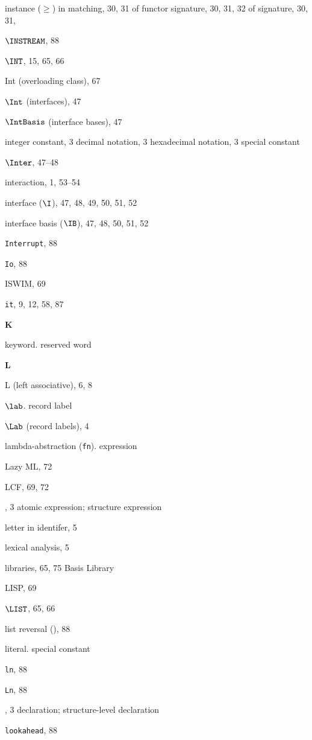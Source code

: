\begin{theindex}
\item instance ($\geq$)
\subitem in matching, 30, 31
\subitem of functor signature, 30, 31, 32
\subitem of signature, 30, 31,
\item $\INSTREAM$, 88
\item $\INT$, 15, 65, 66
\item Int (overloading class), 67
\item $\Int$ (interfaces), 47
\item $\IntBasis$ (interface bases), 47
\item integer constant, 3
\subitem decimal notation, 3
\subitem hexadecimal notation, 3
\subitem \seealso special constant
\item $\Inter$, 47--48
\item interaction, 1, 53--54
\item interface ($\I$), 47, 48, 49, 50, 51, 52
\item interface basis ($\IB$), 47, 48, 50, 51, 52
\item {\tt Interrupt}, 88
\item {\tt Io}, 88
\item ISWIM, 69
\item {\tt it}, 9, 12, 58, 87
\indexspace

\parbox{64mm}{\hfil{\large\bf K}\hfil}

\indexspace
\item keyword. \see reserved word
\indexspace

\parbox{64mm}{\hfil{\large\bf L}\hfil}

\indexspace

\item L (left associative), 6, 8
\item $\lab$. \see record label
\item $\Lab$ (record labels), 4
\item lambda-abstraction ({\tt fn}). \see expression
\item Lazy ML, 72
\item LCF, 69, 72
\item \LET, 3
\subitem \seealso atomic expression; structure expression
\item letter in identifer, 5
\item lexical analysis, 5
\item libraries, 65, 75
\subitem \seealso Basis Library
\item LISP, 69
\item $\LIST$, 65, 66
\item list reversal (), 88
\item literal. \see special constant
\item {\tt ln}, 88
\item {\tt Ln}, 88
\item \LOCAL, 3
\subitem \seealso declaration; structure-level declaration
\item {\tt lookahead}, 88
\indexspace


\end{theindex}
